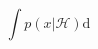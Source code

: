 \documentclass{article}
\newcommand{\dd}{\mathrm{d}}
\newcommand{\hist}{\mathcal{H}}
\begin{document}
$$\int p(x | \hist) \dd$$
\end{document}

